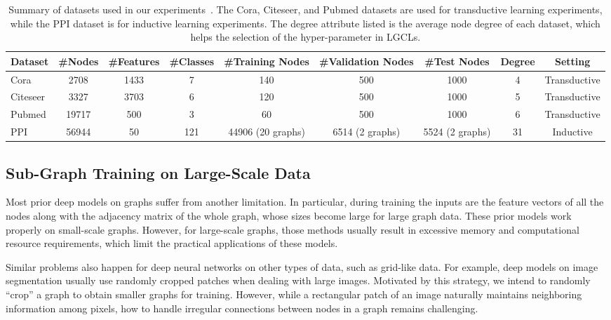 \documentclass[sigconf]{acmart}
\begin{document}
\begin{table*}[t]
\centering \caption{Summary of datasets used in our
experiments~\cite{yang2016revisiting,zitnik2017predicting}. The
Cora, Citeseer, and Pubmed datasets are used for transductive
learning experiments, while the PPI dataset is for inductive
learning experiments. The degree attribute listed is the average
node degree of each dataset, which helps the selection of the
hyper-parameter  in LGCLs.} \label{table:datasets}
\begin{tabular}{  l   c  c  c  c  c  c  c  c }
    \hline
    \textbf{Dataset} & \textbf{\#Nodes} &
    \textbf{\#Features} & \textbf{\#Classes} & \textbf{\#Training Nodes} &
    \textbf{\#Validation Nodes} & \textbf{\#Test Nodes} & \textbf{Degree} & \textbf{Setting}  \\ \hline\hline
    Cora      & 2708   & 1433 & 7   & 140   & 500 & 1000 & 4  & Transductive \\ \hline
    Citeseer  & 3327   & 3703 & 6   & 120   & 500 & 1000 & 5  & Transductive \\ \hline
    Pubmed    & 19717  & 500  & 3   & 60    & 500 & 1000 & 6  & Transductive \\ \hline
    PPI       & 56944  & 50   & 121 & 44906 (20 graphs) & 6514 (2 graphs) & 5524 (2 graphs) & 31 & Inductive    \\
    \hline
\end{tabular}
\end{table*}


\subsection{Sub-Graph Training on Large-Scale Data}


Most prior deep models on graphs suffer from another limitation. In
particular, during training the inputs are the feature vectors of
all the nodes along with the adjacency matrix of the whole graph,
whose sizes become large for large graph data. These prior models
work properly on small-scale graphs. However, for large-scale
graphs, those methods usually result in excessive memory and
computational resource requirements, which limit the practical
applications of these models.


Similar problems also happen for deep neural networks on other types
of data, such as grid-like data. For example, deep models on image
segmentation usually use randomly cropped patches when dealing with
large images. Motivated by this strategy, we intend to randomly
``crop'' a graph to obtain smaller graphs for training. However,
while a rectangular patch of an image naturally maintains
neighboring information among pixels, how to handle irregular
connections between nodes in a graph remains challenging.
\end{document}
